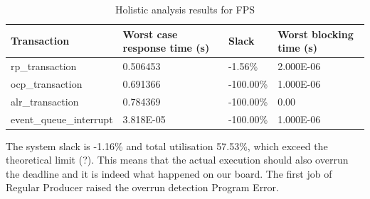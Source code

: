 \documentclass{article}
\begin{document}
\begin{table}[!htbp]
   \centering
   \begin{tabular}{llll}
     \toprule
     Transaction & Worst case response time (s) & Slack & Worst blocking time (s)  \\
     \midrule
     rp\_transaction & 0.506453  & -1.56\% &  2.000E-06  \\
     ocp\_transaction & 0.691366 & -100.00\% & 1.000E-06 \\
     alr\_transaction & 0.784369 & -100.00\% & 0.00 \\
     event\_queue\_interrupt & 3.818E-05 & -100.00\% & 1.000E-06 \\
     \bottomrule
   \end{tabular}
   \caption{Holistic analysis results for FPS}
   \label{tab:holistic-fps}
\end{table}

The system slack is -1.16\% and total utilisation 57.53\%, which exceed the theoretical limit (?). This means that the actual execution should also overrun the deadline and it is indeed what happened on our board. The first job of Regular Producer raised the overrun detection Program Error.


\end{document}
